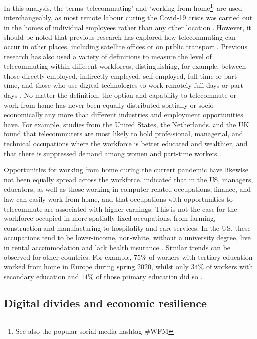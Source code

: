 \documentclass[Royal,times,sageh]{sagej}
\begin{document}
In this analysis, the terms `telecommuting' and `working from
home\footnote{See also the popular social media hashtag \#WFM}' are used
interchangeably, as most remote labour during the Covid-19 crisis was
carried out in the homes of individual employees rather than any other
location \citep{eurofound2020}. However, it should be noted that
previous research has explored how telecommuting can occur in other
places, including satellite offices or on public transport
\citep{felstead2012rapid, siha2006telecommuting}. Previous research has
also used a variety of definitions to measure the level of telecommuting
within different workforces, distinguishing, for example, between those
directly employed, indirectly employed, self-employed, full-time or
part-time, and those who use digital technologies to work remotely
full-days or part-days
\citep{allen2015effective, bailey2002review, haddad2009examination}. No
matter the definition, the option and capability to telecommute or work
from home has never been equally distributed spatially or
socio-economically any more than different industries and employment
opportunities have. For example, studies from the United States, the
Netherlands, and the UK found that telecommuters are most likely to hold
professional, managerial, and technical occupations where the workforce
is better educated and wealthier, and that there is suppressed demand
among women and part-time workers
\citep{headicar2016move, peters2004employees, singh2013modeling}.

Opportunities for working from home during the current pandemic have
likewise not been equally spread across the workforce.
\citet{NBERw26948} indicated that in the US, managers, educators, as
well as those working in computer-related occupations, finance, and law
can easily work from home, and that occupations with opportunities to
telecommute are associated with higher earnings. This is not the case
for the workforce occupied in more spatially fixed occupations, from
farming, construction and manufacturing to hospitality and care
services. In the US, these occupations tend to be lower-income,
non-white, without a university degree, live in rental accommodation and
lack health insurance \citep{NBERw27085}. Similar trends can be observed
for other countries. For example, \(75\)\% of workers with tertiary
education worked from home in Europe during spring \(2020\), whilst only
\(34\)\% of workers with secondary education and \(14\)\% of those
primary education did so \citep{eurofound2020}.

\hypertarget{sec:2.2}{%
\subsection{Digital divides and economic resilience}\label{sec:2.2}}
\end{document}
